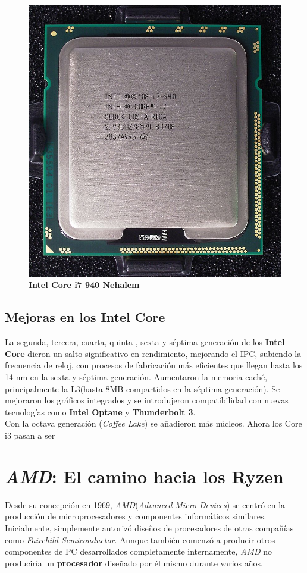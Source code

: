 \begin{figure}[htb]
	\centering
	\includegraphics[scale = 0.2]{Graphics/Intel_core_i7_940_top_R7309478_wp.jpg}
	\caption{\textbf{Intel Core i7 940 Nehalem}}
	\label{fig:25}
\end{figure}

\subsection{Mejoras en los \textbf{Intel Core}}
La segunda, tercera, cuarta, quinta , sexta y séptima generación de los \textbf{Intel Core} dieron un salto significativo en rendimiento, mejorando
el IPC, subiendo la frecuencia de reloj, con procesos de fabricación más eficientes que llegan hasta los 14 nm en la sexta y séptima generación.
Aumentaron la memoria caché, principalmente la L3(hasta 8MB compartidos en la séptima generación). Se mejoraron los gráficos integrados y se introdujeron 
compatibilidad con nuevas tecnologías como \textbf{Intel Optane} y \textbf{Thunderbolt 3}.\\
Con la octava generación (\emph{Coffee Lake}) se añadieron más núcleos. Ahora los Core i3 pasan a ser 

\section{\emph{AMD}: El camino hacia los \textbf{Ryzen}}
Desde su concepción en 1969, \emph{AMD}(\emph{Advanced Micro Devices}) se centró en la producción de microprocesadores y componentes informáticos similares. Inicialmente,
simplemente autorizó diseños de procesadores de otras compañías como \emph{Fairchild Semiconductor}. Aunque también comenzó a producir otros componentes de PC desarrollados
completamente internamente, \emph{AMD} no produciría un \textbf{procesador} diseñado por él mismo durante varios años. 

